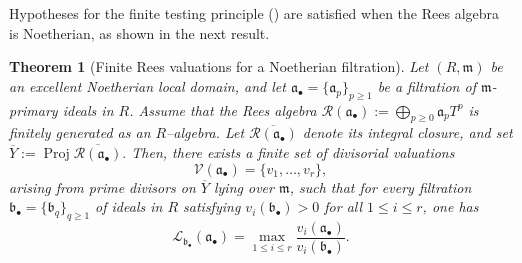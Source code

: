 \documentclass[12pt]{amsart}
\newcommand{\m}{\mathfrak m}
\renewcommand{\a}{\mathfrak{a}}
\renewcommand{\b}{\mathfrak{b}}
\newcommand{\R}{\mathcal{R}}
\newcommand{\Loj}{\mathcal{L}} %
\DeclareMathOperator{\Proj}{Proj}
\newcommand{\abul}{{\a_\bullet}}
\newcommand{\bbul}{{\b_\bullet}}
\theoremstyle{plain}
\newtheorem{theorem}{Theorem}[section]
\theoremstyle{definition}
\numberwithin{equation}{section}
\begin{document}

Hypotheses for the finite testing principle () are satisfied when the Rees algebra is Noetherian, as shown in the next result. 

\begin{theorem}[Finite Rees valuations for a Noetherian filtration]
	\label{thm:finite-testing-fingen}
	Let $(R,\m)$ be an excellent Noetherian local domain, and let
	$\abul=\{\a_p\}_{p\ge1}$ be a filtration of $\m$-primary ideals in $R$.
	Assume that the Rees algebra $\R(\abul):=\bigoplus_{p\ge0}\a_pT^p$
	is finitely generated as an $R$--algebra.
	Let $\overline{\R(\abul)}$ denote its integral closure, and set $\overline{Y}:=\Proj \overline{\R(\abul)}.$
	Then, there exists a finite set of divisorial valuations
	\[
	\mathcal V(\abul)=\{v_1,\dots,v_r\},
	\]
	arising from prime divisors on $\overline{Y}$ lying over $\m$, such that for every filtration $\bbul=\{\b_q\}_{q\ge1}$ of ideals in $R$ satisfying $v_i(\bbul) > 0$ for all $1 \le i \le r$, one has
	\[
	\Loj_{\bbul}(\abul)
	=
	\max_{1\le i\le r}
	\frac{v_i(\abul)}{v_i(\bbul)}.
	\]
\end{theorem}
\end{document}

